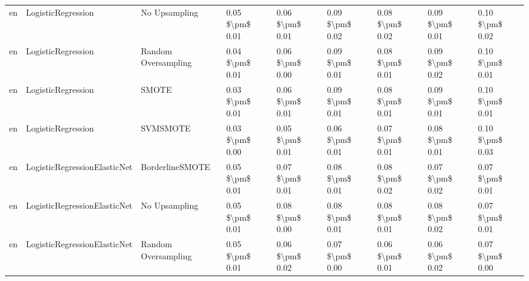 \begin{tabular}{lllllllll}
      en &              LogisticRegression &                 No Upsampling & 0.05 \$\textbackslash pm\$ 0.01 &           0.06 \$\textbackslash pm\$ 0.01 &       0.09 \$\textbackslash pm\$ 0.02 &        0.08 \$\textbackslash pm\$ 0.02 &                         0.09 \$\textbackslash pm\$ 0.01 &     0.10 \$\textbackslash pm\$ 0.02 \\
      en &              LogisticRegression &           Random Oversampling & 0.04 \$\textbackslash pm\$ 0.01 &           0.06 \$\textbackslash pm\$ 0.00 &       0.09 \$\textbackslash pm\$ 0.01 &        0.08 \$\textbackslash pm\$ 0.01 &                         0.09 \$\textbackslash pm\$ 0.02 &     0.10 \$\textbackslash pm\$ 0.01 \\
      en &              LogisticRegression &                         SMOTE & 0.03 \$\textbackslash pm\$ 0.01 &           0.06 \$\textbackslash pm\$ 0.01 &       0.09 \$\textbackslash pm\$ 0.01 &        0.08 \$\textbackslash pm\$ 0.01 &                         0.09 \$\textbackslash pm\$ 0.01 &     0.10 \$\textbackslash pm\$ 0.01 \\
      en &              LogisticRegression &                      SVMSMOTE & 0.03 \$\textbackslash pm\$ 0.00 &           0.05 \$\textbackslash pm\$ 0.01 &       0.06 \$\textbackslash pm\$ 0.01 &        0.07 \$\textbackslash pm\$ 0.01 &                         0.08 \$\textbackslash pm\$ 0.01 &     0.10 \$\textbackslash pm\$ 0.03 \\
      en &    LogisticRegressionElasticNet &               BorderlineSMOTE & 0.05 \$\textbackslash pm\$ 0.01 &           0.07 \$\textbackslash pm\$ 0.01 &       0.08 \$\textbackslash pm\$ 0.01 &        0.08 \$\textbackslash pm\$ 0.02 &                         0.07 \$\textbackslash pm\$ 0.02 &     0.07 \$\textbackslash pm\$ 0.01 \\
      en &    LogisticRegressionElasticNet &                 No Upsampling & 0.05 \$\textbackslash pm\$ 0.01 &           0.08 \$\textbackslash pm\$ 0.00 &       0.08 \$\textbackslash pm\$ 0.01 &        0.08 \$\textbackslash pm\$ 0.01 &                         0.08 \$\textbackslash pm\$ 0.02 &     0.07 \$\textbackslash pm\$ 0.01 \\
      en &    LogisticRegressionElasticNet &           Random Oversampling & 0.05 \$\textbackslash pm\$ 0.01 &           0.06 \$\textbackslash pm\$ 0.02 &       0.07 \$\textbackslash pm\$ 0.00 &        0.06 \$\textbackslash pm\$ 0.01 &                         0.06 \$\textbackslash pm\$ 0.02 &     0.07 \$\textbackslash pm\$ 0.00 \\

\end{tabular}
